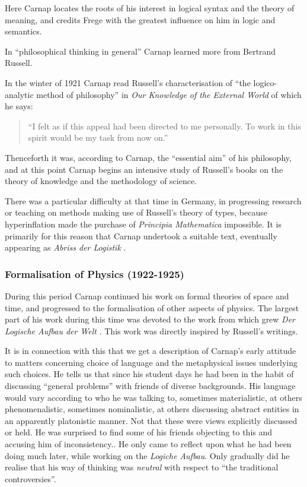 \documentclass[10pt,titlepage]{book}
\begin{document}
Here Carnap locates the roots of his interest in logical syntax and the theory of meaning, and credits Frege with the greatest influence on him in logic and semantics.

In ``philosophical thinking in general'' Carnap learned more from Bertrand Russell.

In the winter of 1921 Carnap read Russell's characterisation of ``the logico-analytic method of philosophy'' in \emph{Our Knowledge of the External World} \cite{russell1921} of which he says:
\begin{quote}
``I felt as if this appeal had been directed to me personally.
To work in this spirit would be my task from now on.''
\end{quote}
Thenceforth it was, according to Carnap, the ``essential aim'' of his philosophy, and at this point Carnap begins an intensive study of Russell's books on the theory of knowledge and the methodology of science.

There was a particular difficulty at that time in Germany, in progressing research or teaching on methods making use of Russell's theory of types, because hyperinflation made the purchase of \emph{Principia Mathematica} impossible.
It is primarily for this reason that Carnap undertook a suitable text, eventually appearing as \emph{Abriss der Logistik} \cite{carnap29}.

\subsubsection{Formalisation of Physics (1922-1925)}

During this period Carnap continued his work on formal theories of space and time, and progressed to the formalisation of other aspects of physics.
The largest part of his work during this time was devoted to the work from which grew \emph{Der Logische Aufbau der Welt} \cite{carnap28}.
This work was directly inspired by Russell's writings.

It is in connection with this that we get a description of Carnap's early attitude to matters concerning choice of language and the metaphysical issues underlying such choices. 
He tells us that since his student days he had been in the habit of discussing ``general problems'' with friends of diverse backgrounds.
His language would vary according to who he was talking to, sometimes materialistic, at others phenomenalistic, sometimes nominalistic, at others discussing abstract entities in an apparently platonistic manner.
Not that these were views explicitly discussed or held.
He was surprised to find some of his friends objecting to this and accusing him of inconsistency..
He only came to reflect upon what he had been doing much later, while working on the \emph{Logiche Aufbau}.
Only gradually did he realise that his way of thinking was \emph{neutral} with respect to ``the traditional controversies''.
\end{document}
